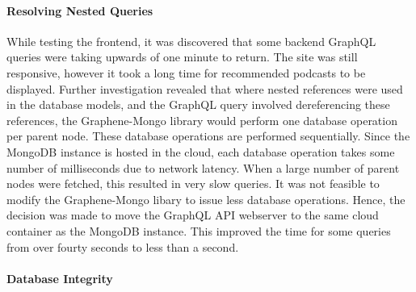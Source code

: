 \documentclass[../report.tex]{subfiles}
\begin{document}
\paragraph{Resolving Nested Queries}

While testing the frontend, it was discovered that some backend GraphQL queries were taking upwards of one minute to return.
The site was still responsive, however it took a long time for recommended podcasts to be displayed.
Further investigation revealed that where nested references were used in the database models, and the GraphQL query involved dereferencing these references, the Graphene-Mongo library would perform one database operation per parent node.
These database operations are performed sequentially. 
Since the MongoDB instance is hosted in the cloud, each database operation takes some number of milliseconds due to network latency.
When a large number of parent nodes were fetched, this resulted in very slow queries.
It was not feasible to modify the Graphene-Mongo libary to issue less database operations.
Hence, the decision was made to move the GraphQL API webserver to the same cloud container as the MongoDB instance.
This improved the time for some queries from over fourty seconds to less than a second.

\paragraph{Database Integrity}





\end{document}
